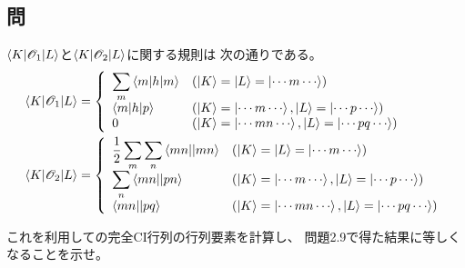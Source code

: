 \subsection{問}
$\braket{K|{\mathscr{O}_1}|L}$と$\braket{K|{\mathscr{O}_2}|L}$に関する規則は
次の通りである。
\begin{align}
	\braket{K|\Oone|L}
&=
	\left\{
	\begin{array}{>{\displaystyle}ll}
		\sum_m \braket{m|h|m} &
		(\ket{K}=\ket{L}=\ket{\cdots m\cdots}) \\
		\braket{m|h|p} &
		(\ket{K}=\ket{\cdots m\cdots}, \ket{L}=\ket{\cdots p\cdots}) \\
		0 &
		(\ket{K}=\ket{\cdots mn\cdots}, \ket{L}=\ket{\cdots pq\cdots})
	\end{array}
	\right. \\
%
%
	\braket{K|\Otwo|L}
&=
	\left\{
	\begin{array}{>{\displaystyle}ll}
		\frac{1}{2} \sum_m \sum_n \antitwo{mn}{mn} &
		(\ket{K}=\ket{L}=\ket{\cdots m\cdots}) \\
		\sum_n \antitwo{mn}{pn} &
		(\ket{K}=\ket{\cdots m\cdots}, \ket{L}=\ket{\cdots p\cdots}) \\
		\antitwo{mn}{pq} &
		(\ket{K}=\ket{\cdots mn\cdots}, \ket{L}=\ket{\cdots pq\cdots})
	\end{array}
	\right.
\end{align}

これを利用しての完全CI行列の行列要素を計算し、
問題2.9で得た結果に等しくなることを示せ。


